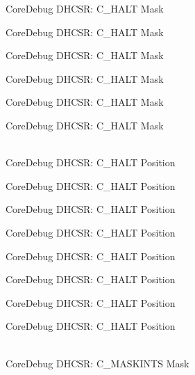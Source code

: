 \begin{DoxyRefList}
\label{deprecated__deprecated000182}%
%
Core\+Debug DHCSR:\+ C\+\_\+\+HALT Mask 

\label{deprecated__deprecated000265}%
%
Core\+Debug DHCSR:\+ C\+\_\+\+HALT Mask 

\label{deprecated__deprecated000324}%
%
Core\+Debug DHCSR:\+ C\+\_\+\+HALT Mask 

\label{deprecated__deprecated000400}%
%
Core\+Debug DHCSR:\+ C\+\_\+\+HALT Mask 

\label{deprecated__deprecated000489}%
%
Core\+Debug DHCSR:\+ C\+\_\+\+HALT Mask 

\label{deprecated__deprecated000591}%
%
Core\+Debug DHCSR:\+ C\+\_\+\+HALT Mask  
\item[{\parbox[t]{\linewidth}{Global \doxylink{group__CMSIS__CoreDebug_gaddf1d43f8857e4efc3dc4e6b15509692}{Core\+Debug\+\_\+\+DHCSR\+\_\+\+C\+\_\+\+HALT\+\_\+\+Pos} }}]\hfill \\
\label{deprecated__deprecated000037}%
%
Core\+Debug DHCSR:\+ C\+\_\+\+HALT Position 

\label{deprecated__deprecated000125}%
%
Core\+Debug DHCSR:\+ C\+\_\+\+HALT Position 

\label{deprecated__deprecated000181}%
%
Core\+Debug DHCSR:\+ C\+\_\+\+HALT Position 

\label{deprecated__deprecated000264}%
%
Core\+Debug DHCSR:\+ C\+\_\+\+HALT Position 

\label{deprecated__deprecated000323}%
%
Core\+Debug DHCSR:\+ C\+\_\+\+HALT Position 

\label{deprecated__deprecated000399}%
%
Core\+Debug DHCSR:\+ C\+\_\+\+HALT Position 

\label{deprecated__deprecated000488}%
%
Core\+Debug DHCSR:\+ C\+\_\+\+HALT Position 

\label{deprecated__deprecated000590}%
%
Core\+Debug DHCSR:\+ C\+\_\+\+HALT Position  
\item[{\parbox[t]{\linewidth}{Global \doxylink{group__CMSIS__CoreDebug_ga77fe1ef3c4a729c1c82fb62a94a51c31}{Core\+Debug\+\_\+\+DHCSR\+\_\+\+C\+\_\+\+MASKINTS\+\_\+\+Msk} }}]\hfill \\
\label{deprecated__deprecated000034}%
%
Core\+Debug DHCSR:\+ C\+\_\+\+MASKINTS Mask 


\end{DoxyRefList}
